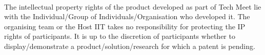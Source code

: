 
\paragraph{}
The intellectual property rights of the product developed as part of Tech Meet lie with the Individual/Group of Individuals/Organisation who developed it. The organising team or the Host IIT takes no responsibility for protecting the IP rights of participants. It is up to the discretion of participants whether to display/demonstrate a product/solution/research for which a patent is pending.